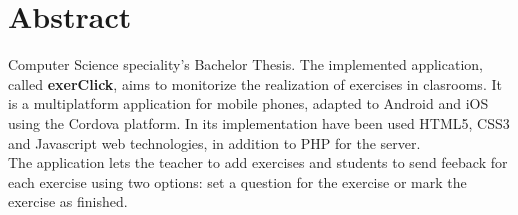 \section*{Abstract}

Computer Science speciality's Bachelor Thesis. The implemented application, called \textbf{exerClick}, aims to monitorize the realization of exercises in clasrooms. It is a multiplatform application for mobile phones, adapted to Android and iOS using the Cordova platform. In its implementation have been used HTML5, CSS3 and Javascript web technologies, in addition to PHP for the server.\\

The application lets the teacher to add exercises and students to send feeback for each exercise using two options: set a question for the exercise or mark the exercise as finished.\\